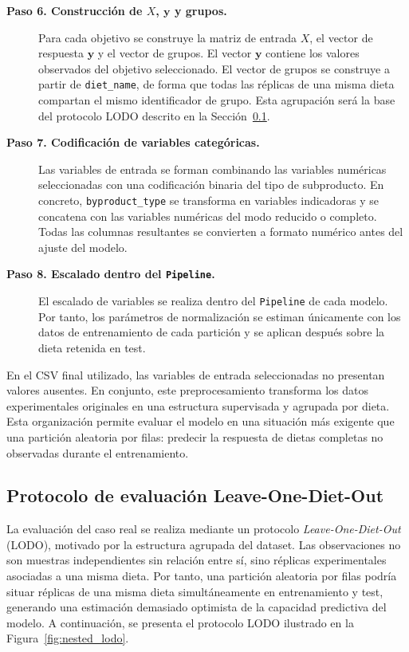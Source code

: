 \begin{description}
\item[\textbf{Paso 6. Construcción de \(X\), \(\bm{y}\) y grupos.}]
Para cada objetivo se construye la matriz de entrada \(X\), el vector de respuesta \(\bm{y}\) y el vector de grupos. El vector \(\bm{y}\) contiene los valores observados del objetivo seleccionado. El vector de grupos se construye a partir de \texttt{diet\_name}, de forma que todas las réplicas de una misma dieta compartan el mismo identificador de grupo. Esta agrupación será la base del protocolo LODO descrito en la Sección~\ref{subsec:lodo_caso_real}.
\item[\textbf{Paso 7. Codificación de variables categóricas.}]
Las variables de entrada se forman combinando las variables numéricas seleccionadas con una codificación binaria del tipo de subproducto. En concreto, \texttt{byproduct\_type} se transforma en variables indicadoras y se concatena con las variables numéricas del modo reducido o completo. Todas las columnas resultantes se convierten a formato numérico antes del ajuste del modelo.
\item[\textbf{Paso 8. Escalado dentro del \texttt{Pipeline}.}]
El escalado de variables se realiza dentro del \texttt{Pipeline} de cada modelo. Por tanto, los parámetros de normalización se estiman únicamente con los datos de entrenamiento de cada partición y se aplican después sobre la dieta retenida en test.
\end{description}

En el CSV final utilizado, las variables de entrada seleccionadas no presentan valores ausentes. En conjunto, este preprocesamiento transforma los datos experimentales originales en una estructura supervisada y agrupada por dieta. Esta organización permite evaluar el modelo en una situación más exigente que una partición aleatoria por filas: predecir la respuesta de dietas completas no observadas durante el entrenamiento.

\subsection{Protocolo de evaluación Leave-One-Diet-Out}\label{subsec:lodo_caso_real}

La evaluación del caso real se realiza mediante un protocolo \emph{Leave-One-Diet-Out} (LODO), motivado por la estructura agrupada del dataset. Las observaciones no son muestras independientes sin relación entre sí, sino réplicas experimentales asociadas a una misma dieta. Por tanto, una partición aleatoria por filas podría situar réplicas de una misma dieta simultáneamente en entrenamiento y test, generando una estimación demasiado optimista de la capacidad predictiva del modelo. A continuación, se presenta el protocolo LODO ilustrado en la Figura~\ref{fig:nested_lodo}.

